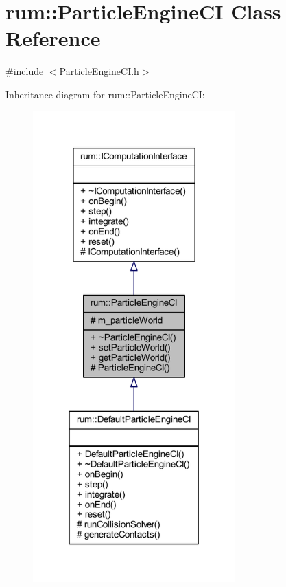 \hypertarget{classrum_1_1_particle_engine_c_i}{}\section{rum\+:\+:Particle\+Engine\+CI Class Reference}
\label{classrum_1_1_particle_engine_c_i}


{\ttfamily \#include $<$Particle\+Engine\+C\+I.\+h$>$}



Inheritance diagram for rum\+:\+:Particle\+Engine\+CI\+:\nopagebreak
\begin{figure}[H]
\begin{center}
\leavevmode
\includegraphics[width=221pt]{classrum_1_1_particle_engine_c_i__inherit__graph}
\end{center}
\end{figure}



